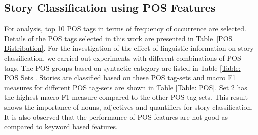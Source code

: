 \documentclass[times, 11pt, a4paper]{article}
\begin{document}
\begin{table}[!htbp]
\renewcommand{\arraystretch}{1.4}
\caption{Macro F1 measure for story classification using feature reduction techniques for Telugu\label{Table: Feature Reduction Telugu}} 
\end{table}	

\newpage

\subsection{Story Classification using POS Features}

For analysis, top 10 POS tags in terms of frequency of occurrence are selected. Details of the POS tags selected in this work are presented in Table~\ref{POS Distribution}. For the investigation of the effect of linguistic information on story classification, we carried out experiments with different combinations of POS tags. The POS groups based on syntactic category are listed in Table \ref{Table: POS Sets}. Stories are classified based on these POS tag-sets and macro F1 measures for different POS tag-sets are shown in Table \ref{Table: POS}. Set 2 has the highest macro F1 measure compared to the other POS tag-sets. This result shows the importance of nouns, adjectives and quantifiers for story classification. It is also observed that the performance of POS features are not good as compared to keyword based features. 
\end{document}
